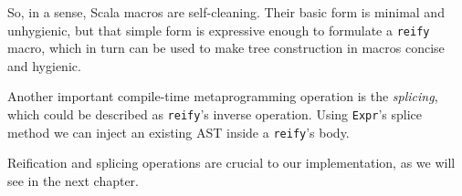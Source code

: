 So, in a sense, Scala macros are self-cleaning. Their basic form is minimal
and unhygienic, but that simple form is expressive enough to formulate a
\texttt{reify} macro, which in turn can be used to make tree construction in macros
concise and hygienic.

Another important compile-time metaprogramming operation is the \emph{splicing},
which could be described as \texttt{reify}'s inverse operation. Using \texttt{Expr}'s splice
method we can inject an existing AST inside a \texttt{reify}'s body.

Reification and splicing operations are crucial to our implementation, as we
will see in the next chapter.
